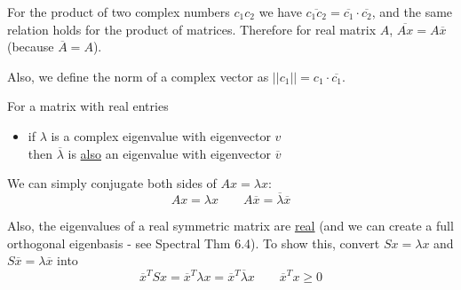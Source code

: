 \documentclass[12pt]{article} %
\begin{document}
For the product of two complex numbers $c_1 c_2$ we have $\overline{c_1 c_2 } = \overline{c_1} \cdot \overline{c_2}$, and the same relation holds for the product of matrices. Therefore for real matrix $A$, $\overline{Ax} = A \overline{x}$ (because $\overline{A} = A$).

Also, we define the norm of a complex vector as $||c_1|| = c_1 \cdot \overline{c_1}$. 

For a matrix with real entries
\begin{itemize}[topsep=-1pt,itemsep=-1pt]
    \item if $\lambda$ is a complex eigenvalue with eigenvector $v$ \\
    then $\overline{\lambda}$ is \href{https://textbooks.math.gatech.edu/ila/complex-eigenvalues.html}{also} an eigenvalue with eigenvector $\overline{v}$
\end{itemize}
We can simply conjugate both sides of $Ax = \lambda x$:
\begin{equation*}
    Ax = \lambda x \qquad A \overline{x} = \overline{\lambda} \overline{x}
\end{equation*}




Also, the eigenvalues of a real symmetric matrix are \href{https://math.stackexchange.com/questions/354115/prove-that-the-eigenvalues-of-a-real-symmetric-matrix-are-real}{real} (and we can create a full orthogonal eigenbasis - see Spectral Thm 6.4). To show this, convert $Sx = \lambda x$ and $S\overline{x} = \lambda \overline{x}$ into 
\begin{equation*}
    \overline{x}^TSx = \overline{x}^T \lambda x = \overline{x}^T \overline{\lambda}x
    \qquad
    \overline{x}^Tx \geq 0
\end{equation*}



\newpage
{}
\end{document}
